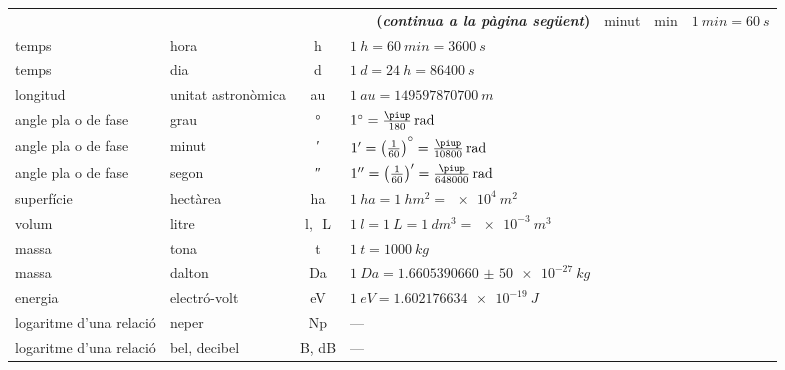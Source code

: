 \begin{ThreePartTable}
\begin{longtable}[h]{llcl}
   \multicolumn{4}{r}{\sffamily\bfseries\color{NavyBlue}(\emph{continua a la pàgina següent})}
   \endfoot
   \insertTableNotes
   \endlastfoot
   temps & minut &  \unit{min}& $\qty{1}{min} = \qty{60}{s}$ \\
   temps & hora & \unit{h} & $\qty{1}{h} = \qty{60}{min} = \qty{3600}{s}$ \\
   temps & dia & \unit{d} & $\qty{1}{d} = \qty{24}{h} = \qty{86400}{s}$\\
   longitud & unitat astronòmica\tnote{\color{blue}(a)} &  \unit{au} &  $\qty{1}{au} =  \qty{149597870700}{m}$ \\
   angle pla o de fase & grau &  \unit{\degree} &   $\ang{1} = \frac{\piup}{180}\unit{\,rad}$ \\[2mm]
   angle pla o de fase & minut & \unit{\arcminute} & $\ang{;1;} = \big(\frac{1}{60}\big)\raisebox{1.5mm}{\unit{\degree}} = \frac{\piup}{10800}\unit{\,rad}$ \\[2mm]
   angle pla  o de fase & segon & \unit{\arcsecond} & $\ang{;;1} = \big(\frac{1}{60}\big)' = \frac{\piup}{648000}\unit{\,rad}$ \\[2mm]
   superfície & hectàrea\tnote{\color{blue}(b)} & \unit{ha} & $\qty{1}{ha} = \qty{1}{hm^2} = \qty[print-unity-mantissa = false]{e4}{m^2}$\\
   volum & litre &  \unit{l},\unit{\,L}\tnote{\color{blue}(c)} & $\qty{1}{l} = \qty{1}{L} = \qty{1}{dm^3} = \qty[print-unity-mantissa = false]{e-3}{m^3}$ \\
   massa & tona\tnote{\color{blue}(d)} & \unit{t} & $\qty{1}{t} = \qty{1000}{kg}$\\
   massa & dalton\tnote{\color{blue}(e)} & Da & $\qty{1}{Da} = \qty{1,6605390660(50)e-27}{kg}$\\
   energia & electró-volt\tnote{\color{blue}(f)} & eV & $\qty{1}{eV} = \qty{1,602176634e-19}{J}$ \\
   logaritme d'una relació & neper\tnote{\color{blue}(g)} & \unit{Np} & ---\\
   logaritme d'una relació & bel, decibel\tnote{\color{blue}(g)} &  \unit{B}, \unit{dB} & ---\\
   \bottomrule[1pt]
\end{longtable}
\end{ThreePartTable}
\index{\unit{\degree}}


